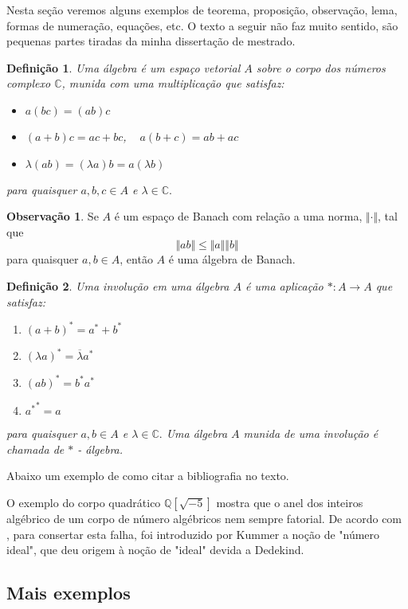 \documentclass[
	12pt,				%
	oneside,			%
	a4paper,			%
	english,			%
	french,				%
	spanish,			%
	brazil,				%
	]{abntex2}
\newcommand{\Q}{\ensuremath {\mathbb{Q}} }
\newcommand{\C}{\ensuremath {\mathbb{C}} }
\theoremstyle{plain}
\newtheorem{defi}{Definição}[chapter]
\theoremstyle{definition}
\newtheorem{obs}{Observação}[chapter]
\begin{document}
Nesta seção veremos alguns exemplos de teorema, proposição, observação, lema, formas de numeração, equações, etc.  O texto a seguir não faz muito sentido, são pequenas partes tiradas da minha dissertação de mestrado.

\begin{defi}
Uma álgebra é um espaço vetorial $A$ sobre o corpo dos números complexo $\C$, munida com uma multiplicação que satisfaz:
\begin{itemize}
\item $a(bc)=(ab)c$
\item $(a+b)c = ac+bc$, \,\,\, $a(b+c)=ab+ac$
\item $\lambda(ab)=(\lambda a)b=a(\lambda b)$
\end{itemize}
para quaisquer $a, b, c \in A$ e $\lambda \in \C.$
\end{defi}

\begin{obs}
Se $A$ é um espaço de Banach com relação a uma norma, $\Vert \cdot \Vert $, tal que $$\Vert ab \Vert \leq \Vert a \Vert \Vert b \Vert$$ para quaisquer $a, b \in A$, então $A$ é uma álgebra de Banach.
\end{obs}


\begin{defi} 
Uma involução em uma álgebra $A$ é uma aplicação $\ast: A \rightarrow A$ que satisfaz:
\begin{enumerate}
\item $(a+b)^{\ast}= a^{\ast}+b^{\ast}$
\item $(\lambda a )^{\ast} = \overline{\lambda} a^{\ast}$
\item $(ab)^{\ast}=b^{\ast}a^{\ast}$
\item ${a^{\ast}}^{\ast}=a$
\end{enumerate}
para quaisquer $a, b \in A$ e $\lambda \in \C.$ Uma álgebra $A$ munida de uma involução é chamada de $\ast$ - álgebra.
\end{defi}


Abaixo um exemplo de como citar a bibliografia no texto.

O exemplo do corpo quadrático $\Q[\sqrt{-5}]$ mostra que o anel dos inteiros algébrico de um corpo de número algébricos nem sempre  fatorial.  De acordo com \cite{endler2006}, para consertar esta falha, foi introduzido por Kummer a noção de "número ideal", que deu origem à noção de "ideal" devida a Dedekind.


\subsection{Mais exemplos} %
\end{document}
